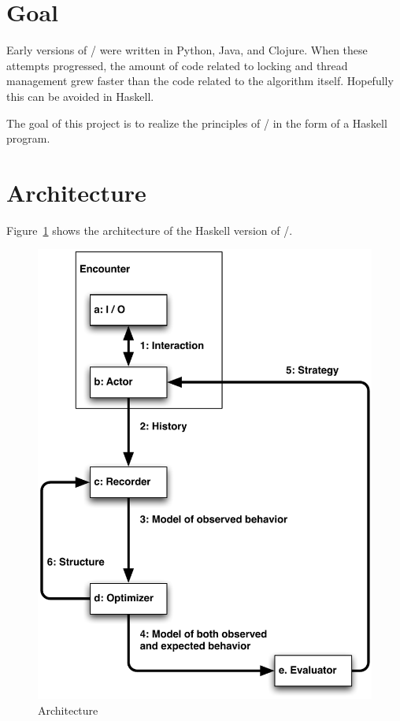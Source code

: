 \documentclass[12pt,a4paper]{artikel3}
\begin{document}
\section{Goal}

Early versions of \LExAu/ were written in Python, Java, and Clojure. When these attempts progressed, the amount of code related to locking and thread management grew faster than the code related to the algorithm itself. Hopefully this can be avoided in Haskell.

The goal of this project is to realize the principles of \LExAu/ in the form of a Haskell program.

\section{Architecture}

Figure~\ref{fig:architecture} shows the architecture of the Haskell version of \LExAu/.

\begin{figure}[bp]
  \includegraphics[width=\textwidth]{architecture}
  \caption{Architecture}\label{fig:architecture}
\end{figure}
\end{document}
